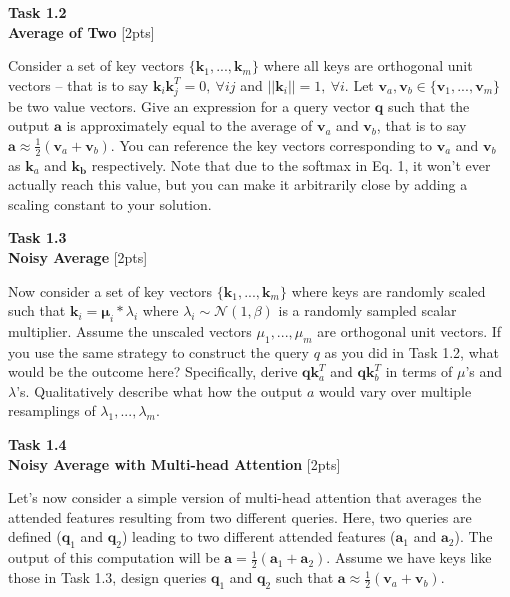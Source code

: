 \documentclass[12pt,article]{article}
\newenvironment{task}[2][Task]
    { \begin{mdframed}[backgroundcolor=gray!20] \textbf{#1 #2} \\}
    {  \end{mdframed}}
\begin{document}
\begin{task}{1.2} 
\textbf{Average of Two} [2pts]

Consider a set of key vectors $\{\mathbf{k}_1, ... , \mathbf{k}_m\}$ where all keys are orthogonal unit vectors -- that is to say $\mathbf{k}_i\mathbf{k}_j^T =0,~\forall ij$ and $||\mathbf{k}_i||=1,~\forall i$. Let $\mathbf{v}_a, \mathbf{v}_b \in \{\mathbf{v}_1, ..., \mathbf{v}_m\}$ be two value vectors. Give an expression for a query vector $\mathbf{q}$ such that the output $\mathbf{a}$ is approximately equal to the average of $\mathbf{v}_a$ and $\mathbf{v}_b$, that is to say $\mathbf{a} \approx \frac{1}{2}(\mathbf{v}_a + \mathbf{v}_b)$. You can reference the key vectors corresponding to $\mathbf{v}_a$ and $\mathbf{v}_b$ as $\mathbf{k}_a$ and $\mathbf{k_b}$ respectively. Note that due to the softmax in Eq. 1, it won't ever actually reach this value, but you can make it arbitrarily close by adding a scaling constant to your solution.
\end{task}

\begin{task}{1.3} 
\textbf{Noisy Average} [2pts]

Now consider a set of key vectors $\{\mathbf{k}_1, ... , \mathbf{k}_m\}$ where keys are randomly scaled such that $\mathbf{k}_i = \mathbf{\mu}_i*\lambda_i$ where $\lambda_i \sim \mathcal{N}(1, \beta)$ is a randomly sampled scalar multiplier. Assume the unscaled vectors $\mu_1, ..., \mu_m$ are orthogonal unit vectors. If you use the same strategy to construct the query $q$ as you did in Task 1.2, what would be the outcome here? Specifically, derive $\mathbf{q}\mathbf{k}_a^T$ and $\mathbf{q}\mathbf{k}_b^T$ in terms of $\mu$'s and $\lambda$'s. Qualitatively describe what how the output $a$ would vary over multiple resamplings of $\lambda_1, ..., \lambda_m$.
\end{task}

\begin{task}{1.4} 
\textbf{Noisy Average with Multi-head Attention} [2pts]

Let's now consider a simple version of multi-head attention that averages the attended features resulting from two different queries. Here, two queries are defined ($\mathbf{q}_1$ and $\mathbf{q}_2$) leading to two different attended features ($\mathbf{a}_1$ and $\mathbf{a}_2$). The output of this computation will be $\mathbf{a} = \frac{1}{2}(\mathbf{a}_1 + \mathbf{a}_2)$. Assume we have keys like those in Task 1.3, design queries $\mathbf{q}_1$ and $\mathbf{q}_2$ such that $\mathbf{a} \approx \frac{1}{2}(\mathbf{v}_a + \mathbf{v}_b)$.
\end{task}
\end{document}
